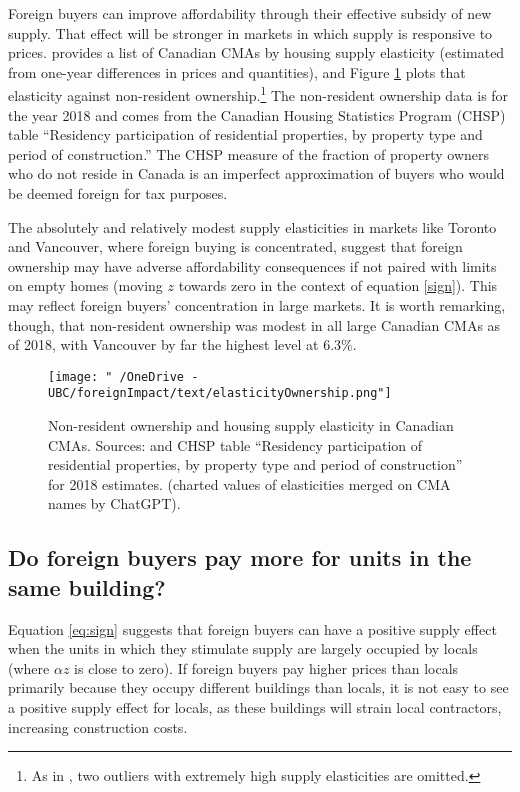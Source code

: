 \documentclass[12pt]{article}
\begin{document}
Foreign buyers can improve affordability through their effective subsidy of new
supply. That effect will be stronger in markets in which supply is responsive
to prices. \textcite{paixao2021housing} provides a list of Canadian CMAs by
housing supply elasticity (estimated from one-year differences in prices and
quantities), and Figure \ref{fig:elasticityNonResident} plots that elasticity
against non-resident ownership.\footnote{As in \textcite{paixao2021housing}, two
outliers with extremely high supply elasticities are omitted.} The non-resident
ownership data is for the year 2018 and comes from the Canadian Housing
Statistics Program (CHSP) table ``Residency participation of residential
properties, by property type and period of construction.''  The CHSP measure of
the fraction of property owners who do not reside in Canada is an imperfect
approximation of buyers who would be deemed foreign for tax purposes.

The absolutely and relatively modest supply elasticities in markets like
Toronto and Vancouver, where foreign buying is concentrated, suggest that
foreign ownership may have adverse affordability consequences if not paired
with limits on empty homes (moving $z$ towards zero in the context of equation
\eqref{sign}). This may reflect foreign buyers' concentration in large markets.
It is worth remarking, though, that non-resident ownership was modest in all
large Canadian CMAs as of 2018, with Vancouver by far the highest level at
6.3\%.

\begin{figure}
	\centering
	\texttt{[image: "~/OneDrive - UBC/foreignImpact/text/elasticityOwnership.png"]}
\caption{\label{fig:elasticityNonResident} Non-resident ownership and housing supply elasticity in Canadian CMAs. Sources: \textcite{paixao2021housing} and CHSP table ``Residency participation of residential properties, by property type and period of construction'' for 2018 estimates. (charted values of elasticities merged on CMA names by ChatGPT).}
\end{figure}

\subsection{Do foreign buyers pay more for units in the same building?}

Equation \eqref{eq:sign} suggests that foreign buyers can have a positive
supply effect when the units in which they stimulate supply are largely
occupied by locals (where $\alpha z$ is close to zero). If foreign buyers pay
higher prices than locals primarily because they occupy different buildings than
locals, it is not easy to see a positive supply effect for
locals, as these buildings will strain local contractors, increasing
construction costs.
\end{document}
